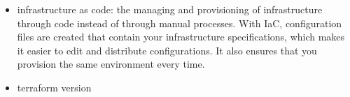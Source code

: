 \documentclass{article}
\begin{document}
\begin{itemize}
\item infrastructure as code: the managing and provisioning of infrastructure through code instead of through manual processes. With IaC, configuration files are created that contain your infrastructure specifications, which makes it easier to edit and distribute configurations. It also ensures that you provision the same environment every time.

\item terraform version
\end{itemize}
\end{document}
